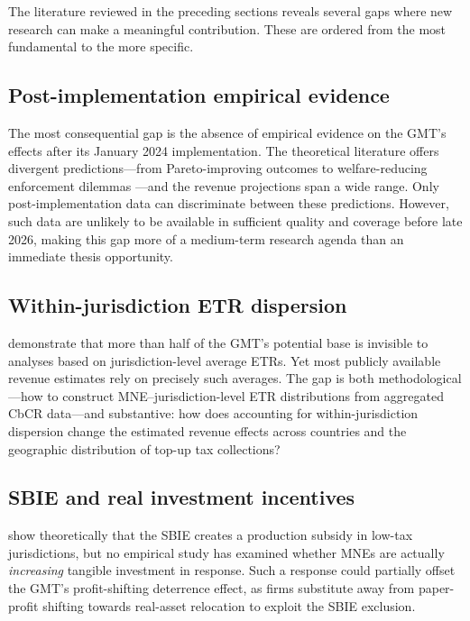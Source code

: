 \documentclass[12pt,a4paper]{article}
\begin{document}
The literature reviewed in the preceding sections reveals several gaps where new research can make a meaningful contribution.
These are ordered from the most fundamental to the more specific.

\subsection{Post-implementation empirical evidence}

The most consequential gap is the absence of empirical evidence on the GMT's effects after its January 2024 implementation.
The theoretical literature offers divergent predictions---from Pareto-improving outcomes \parencite{hebous2023} to welfare-reducing enforcement dilemmas \parencite{hindriks2025}---and the revenue projections span a wide range.
Only post-implementation data can discriminate between these predictions.
However, such data are unlikely to be available in sufficient quality and coverage before late 2026, making this gap more of a medium-term research agenda than an immediate thesis opportunity.

\subsection{Within-jurisdiction ETR dispersion}

\textcite{hugger2025} demonstrate that more than half of the GMT's potential base is invisible to analyses based on jurisdiction-level average ETRs.
Yet most publicly available revenue estimates rely on precisely such averages.
The gap is both methodological---how to construct MNE--jurisdiction-level ETR distributions from aggregated CbCR data---and substantive: how does accounting for within-jurisdiction dispersion change the estimated revenue effects across countries and the geographic distribution of top-up tax collections?

\subsection{SBIE and real investment incentives}

\textcite{schjelderup2024} show theoretically that the SBIE creates a production subsidy in low-tax jurisdictions, but no empirical study has examined whether MNEs are actually \emph{increasing} tangible investment in response.
Such a response could partially offset the GMT's profit-shifting deterrence effect, as firms substitute away from paper-profit shifting towards real-asset relocation to exploit the SBIE exclusion.
\end{document}
